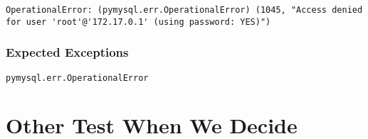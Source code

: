 \documentclass[12pt]{article}
\begin{document}
\begin{lstlisting}
OperationalError: (pymysql.err.OperationalError) (1045, "Access denied for user 'root'@'172.17.0.1' (using password: YES)")
\end{lstlisting}

\subsubsection{Expected Exceptions}

\begin{verbatim}
pymysql.err.OperationalError
\end{verbatim}

\section{Other Test When We Decide}







\end{document}
